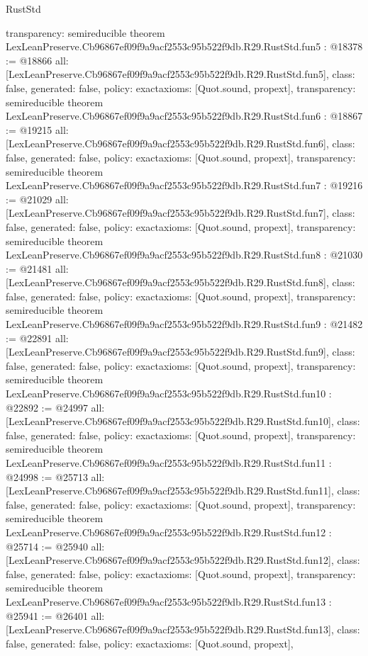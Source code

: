 \begin{lexlean}{RustStd}
\begin{coremodule}
{  transparency: semireducible
}
theorem LexLeanPreserve.Cb96867ef09f9a9acf2553c95b522f9db.R29.RustStd.fun5 : @18378 := @18866 {
  all: [LexLeanPreserve.Cb96867ef09f9a9acf2553c95b522f9db.R29.RustStd.fun5],
  class: false,
  generated: false,
  policy: exact{axioms: [Quot.sound, propext]},
  transparency: semireducible
}
theorem LexLeanPreserve.Cb96867ef09f9a9acf2553c95b522f9db.R29.RustStd.fun6 : @18867 := @19215 {
  all: [LexLeanPreserve.Cb96867ef09f9a9acf2553c95b522f9db.R29.RustStd.fun6],
  class: false,
  generated: false,
  policy: exact{axioms: [Quot.sound, propext]},
  transparency: semireducible
}
theorem LexLeanPreserve.Cb96867ef09f9a9acf2553c95b522f9db.R29.RustStd.fun7 : @19216 := @21029 {
  all: [LexLeanPreserve.Cb96867ef09f9a9acf2553c95b522f9db.R29.RustStd.fun7],
  class: false,
  generated: false,
  policy: exact{axioms: [Quot.sound, propext]},
  transparency: semireducible
}
theorem LexLeanPreserve.Cb96867ef09f9a9acf2553c95b522f9db.R29.RustStd.fun8 : @21030 := @21481 {
  all: [LexLeanPreserve.Cb96867ef09f9a9acf2553c95b522f9db.R29.RustStd.fun8],
  class: false,
  generated: false,
  policy: exact{axioms: [Quot.sound, propext]},
  transparency: semireducible
}
theorem LexLeanPreserve.Cb96867ef09f9a9acf2553c95b522f9db.R29.RustStd.fun9 : @21482 := @22891 {
  all: [LexLeanPreserve.Cb96867ef09f9a9acf2553c95b522f9db.R29.RustStd.fun9],
  class: false,
  generated: false,
  policy: exact{axioms: [Quot.sound, propext]},
  transparency: semireducible
}
theorem LexLeanPreserve.Cb96867ef09f9a9acf2553c95b522f9db.R29.RustStd.fun10 : @22892 := @24997 {
  all: [LexLeanPreserve.Cb96867ef09f9a9acf2553c95b522f9db.R29.RustStd.fun10],
  class: false,
  generated: false,
  policy: exact{axioms: [Quot.sound, propext]},
  transparency: semireducible
}
theorem LexLeanPreserve.Cb96867ef09f9a9acf2553c95b522f9db.R29.RustStd.fun11 : @24998 := @25713 {
  all: [LexLeanPreserve.Cb96867ef09f9a9acf2553c95b522f9db.R29.RustStd.fun11],
  class: false,
  generated: false,
  policy: exact{axioms: [Quot.sound, propext]},
  transparency: semireducible
}
theorem LexLeanPreserve.Cb96867ef09f9a9acf2553c95b522f9db.R29.RustStd.fun12 : @25714 := @25940 {
  all: [LexLeanPreserve.Cb96867ef09f9a9acf2553c95b522f9db.R29.RustStd.fun12],
  class: false,
  generated: false,
  policy: exact{axioms: [Quot.sound, propext]},
  transparency: semireducible
}
theorem LexLeanPreserve.Cb96867ef09f9a9acf2553c95b522f9db.R29.RustStd.fun13 : @25941 := @26401 {
  all: [LexLeanPreserve.Cb96867ef09f9a9acf2553c95b522f9db.R29.RustStd.fun13],
  class: false,
  generated: false,
  policy: exact{axioms: [Quot.sound, propext]},
}
\end{coremodule}
\end{lexlean}

